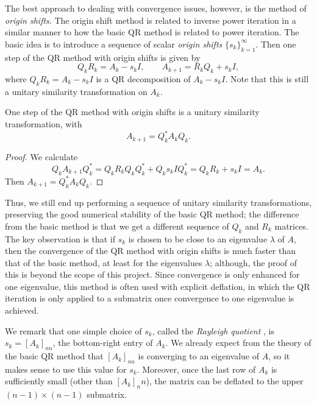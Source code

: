 \documentclass{article}
\begin{document}
The best approach to dealing with convergence issues, however, is the method of \textit{origin shifts}. The origin shift method is related to inverse power iteration in a similar manner to how the basic QR method is related to power iteration. The basic idea is to introduce a sequence of scalar \textit{origin shifts} $\{s_k\}_{k=1}^\infty$. Then one step of the QR method with origin shifts is given by
\begin{equation*}
	Q_kR_k = A_k - s_kI, \qquad A_{k+1} = R_kQ_k + s_kI,
\end{equation*}
where $Q_kR_k = A_k - s_kI$ is a QR decomposition of $A_k - s_kI$. Note that this is still a unitary similarity transformation on $A_k$.
\begin{theorem}
	One step of the QR method with origin shifts is a unitary similarity transformation, with
	\begin{equation*}
		A_{k+1} = Q_k^*A_kQ_k.
	\end{equation*}
\end{theorem}
\begin{proof}
	We calculate
	\begin{equation*}
		Q_kA_{k+1}Q_k^* = Q_kR_kQ_kQ_k^* + Q_ks_kIQ_k^* = Q_kR_k + s_kI = A_k.
	\end{equation*}
	Then $A_{k+1} = Q_k^*A_kQ_k$.
\end{proof}
Thus, we still end up performing a sequence of unitary similarity transformations, preserving the good numerical stability of the basic QR method; the difference from the basic method is that we get a different sequence of $Q_k$ and $R_k$ matrices. The key observation is that if $s_k$ is chosen to be close to an eigenvalue $\lambda$ of $A$, then the convergence of the QR method with origin shifts is much faster than that of the basic method, at least for the eigenvalues $\lambda$; although, the proof of this is beyond the scope of this project. Since convergence is only enhanced for one eigenvalue, this method is often used with explicit deflation, in which the QR iteration is only applied to a submatrix once convergence to one eigenvalue is achieved.

We remark that one simple choice of $s_k$, called the \emph{Rayleigh quotient} \cite{ackleh_2009}, is $s_k = [A_k]_{nn}$, the bottom-right entry of $A_k$. We already expect from the theory of the basic QR method that $[A_k]_{nn}$ is converging to an eigenvalue of $A$, so it makes sense to use this value for $s_k$. Moreover, once the last row of $A_k$ is sufficiently small (other than $[A_k]_nn$), the matrix can be deflated to the upper $(n-1)\times (n-1)$ submatrix. 
\end{document}
